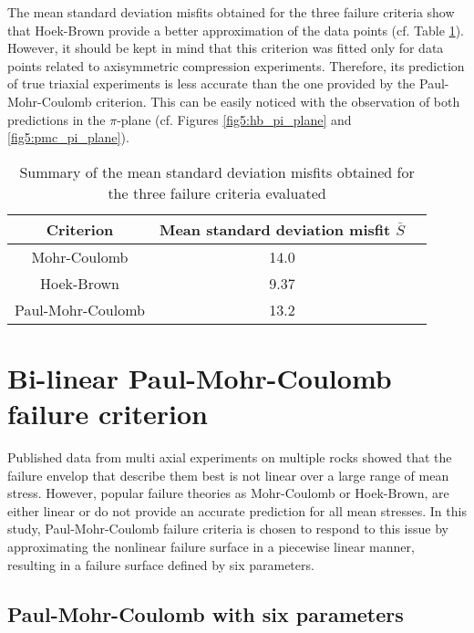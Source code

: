 The mean standard deviation misfits obtained for the three failure criteria show that Hoek-Brown provide a better approximation of the data points (cf. Table \ref{tb5:stand_dev}). However, it should be kept in mind that this criterion was fitted only for data points related to axisymmetric compression experiments. Therefore, its prediction of true triaxial experiments is less accurate than the one provided by the Paul-Mohr-Coulomb criterion. This can be easily noticed with the observation of both predictions in the $\pi$-plane (cf. Figures \ref{fig5:hb_pi_plane} and \ref{fig5:pmc_pi_plane}). 

\begin{table}
    \centering
    \begin{tabular}{ccc}
        \hline 
        Criterion & Mean standard deviation misfit $\bar{S}$ \\
        \hline
        \hline
        Mohr-Coulomb & 14.0 \\
        Hoek-Brown & 9.37 \\
        Paul-Mohr-Coulomb & 13.2 \\
        \hline
    \end{tabular}
    \captionsetup{justification=centering}
    \caption{Summary of the mean standard deviation misfits obtained for the three failure criteria evaluated}
    \label{tb5:stand_dev}
\end{table}

\section{Bi-linear Paul-Mohr-Coulomb failure criterion}\label{ch5:PMC}

Published data from multi axial experiments on multiple rocks showed that the failure envelop that describe them best is not linear over a large range of mean stress. However, popular failure theories as Mohr-Coulomb or Hoek-Brown, are either linear or do not provide an accurate prediction for all mean stresses. In this study, Paul-Mohr-Coulomb failure criteria is chosen to respond to this issue by approximating the nonlinear failure surface in a piecewise linear manner, resulting in a failure surface defined by six parameters. 

\subsection{Paul-Mohr-Coulomb with six parameters}

